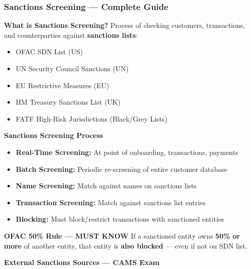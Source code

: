 \documentclass[12pt,aspectratio=169]{beamer}
\renewcommand{\scriptsize}{\fontsize{4.5}{5.5}\selectfont}
\begin{document}
	\begin{frame}
		\frametitle{\fontsize{11}{13}\selectfont \textbf{Sanctions Screening — Complete Guide}}
		\begin{block}{\fontsize{7}{9}\selectfont \textbf{What is Sanctions Screening?}}
			\scriptsize
			Process of checking customers, transactions, and counterparties against \textbf{sanctions lists}:
			\begin{itemize}
				\item OFAC SDN List (US)
				\item UN Security Council Sanctions (UN)
				\item EU Restrictive Measures (EU)
				\item HM Treasury Sanctions List (UK)
				\item FATF High-Risk Jurisdictions (Black/Grey Lists)
			\end{itemize}
		\end{block}
		\vspace{0.02cm}
		\begin{block}{\fontsize{7}{9}\selectfont \textbf{Sanctions Screening Process}}
			\scriptsize
			\begin{itemize}
				\item \textbf{Real-Time Screening:} At point of onboarding, transactions, payments
				\item \textbf{Batch Screening:} Periodic re-screening of entire customer database
				\item \textbf{Name Screening:} Match against names on sanctions lists
				\item \textbf{Transaction Screening:} Match against sanctions list entries
				\item \textbf{Blocking:} Must block/restrict transactions with sanctioned entities
			\end{itemize}
		\end{block}
		\vspace{0.02cm}
		\begin{block}{\fontsize{7}{9}\selectfont \textbf{OFAC 50\% Rule — MUST KNOW}}
			\scriptsize
			If a sanctioned entity owns \textbf{50\% or more} of another entity, that entity is \textbf{also blocked} — even if not on SDN list.
		\end{block}
		\vspace{0.02cm}
		\begin{block}{\fontsize{7}{9}\selectfont \textbf{External Sanctions Sources — CAMS Exam}}

\end{block}
\end{frame}
\end{document}
